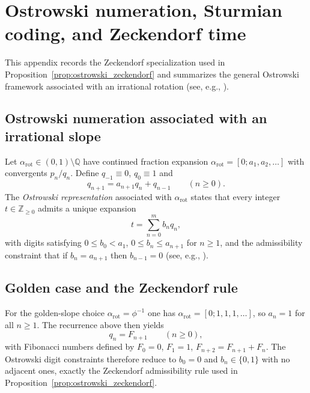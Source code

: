 \section{Ostrowski numeration, Sturmian coding, and Zeckendorf time}
\label{app:ostrowski}

This appendix records the Zeckendorf specialization used in Proposition~\ref{prop:ostrowski_zeckendorf} and summarizes the general Ostrowski framework associated with an irrational rotation (see, e.g., \cite{Zeckendorf1972,AlloucheShallit2003}).

\subsection{Ostrowski numeration associated with an irrational slope}
Let $\alpha_{\mathrm{rot}}\in(0,1)\setminus\mathbb{Q}$ have continued fraction expansion $\alpha_{\mathrm{rot}}=[0;a_1,a_2,\dots]$ with convergents $p_n/q_n$. Define $q_{-1}\equiv 0$, $q_0\equiv 1$ and
\begin{equation}
    q_{n+1}=a_{n+1}q_n+q_{n-1}\qquad (n\ge 0).
\end{equation}
The \emph{Ostrowski representation} associated with $\alpha_{\mathrm{rot}}$ states that every integer $t\in\mathbb{Z}_{\ge 0}$ admits a unique expansion
\begin{equation}
    t=\sum_{n=0}^{m} b_n q_n,
\end{equation}
with digits satisfying $0\le b_0<a_1$, $0\le b_n\le a_{n+1}$ for $n\ge 1$, and the admissibility constraint that if $b_n=a_{n+1}$ then $b_{n-1}=0$ (see, e.g., \cite{AlloucheShallit2003}).

\subsection{Golden case and the Zeckendorf rule}
For the golden-slope choice $\alpha_{\mathrm{rot}}=\phi^{-1}$ one has $\alpha_{\mathrm{rot}}=[0;1,1,1,\dots]$, so $a_n=1$ for all $n\ge 1$. The recurrence above then yields
\begin{equation}
    q_n = F_{n+1}\qquad (n\ge 0),
\end{equation}
with Fibonacci numbers defined by $F_0=0$, $F_1=1$, $F_{n+2}=F_{n+1}+F_n$. The Ostrowski digit constraints therefore reduce to $b_0=0$ and $b_n\in\{0,1\}$ with no adjacent ones, exactly the Zeckendorf admissibility rule used in Proposition~\ref{prop:ostrowski_zeckendorf}.

